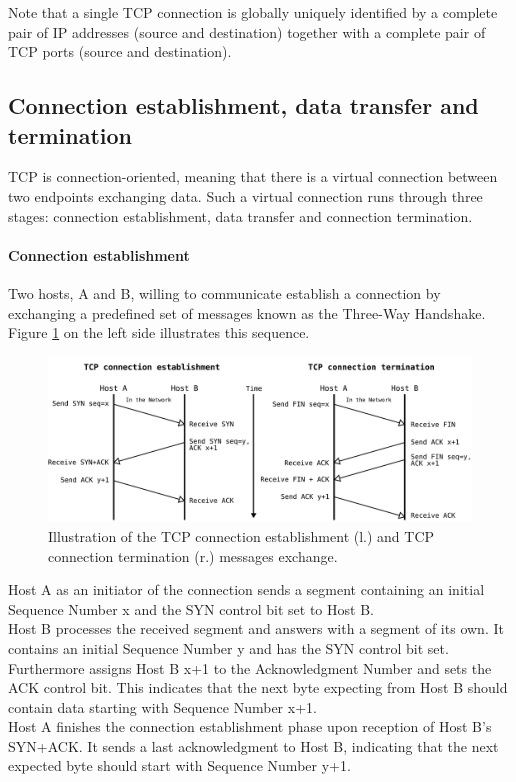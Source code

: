 Note that a single TCP connection is globally uniquely identified by a complete pair of IP addresses (source and destination) together with a complete pair of TCP ports (source and destination).

\subsection*{Connection establishment, data transfer and termination}

TCP is connection-oriented, meaning that there is a virtual connection between two endpoints exchanging data. Such a virtual connection runs through three stages: connection establishment, data transfer and connection termination.

\paragraph{Connection establishment}

Two hosts, A and B, willing to communicate establish a connection by exchanging a predefined set of messages known as the Three-Way Handshake. Figure \ref{fig:TCPConnectionEstablishmentAndTermination} on the left side illustrates this sequence. 

\begin{figure}[H]
	\begin{center} 
		\def\svgwidth{1\textwidth}
		\includegraphics[scale=0.24]{../illustrations/importantConcepts/TCPHandshake.pdf} 
		\caption[Caption for the list of figures.]{Illustration of the TCP connection establishment (l.) and TCP connection termination (r.) messages exchange.}
		\label{fig:TCPConnectionEstablishmentAndTermination}
	\end{center}
\end{figure}

Host A as an initiator of the connection sends a segment containing an initial Sequence Number x and the SYN control bit set to Host B. \smallskip\\Host B processes the received segment and answers with a segment of its own. It contains an initial Sequence Number y and has the SYN control bit set. Furthermore assigns Host B x+1 to the Acknowledgment Number and sets the ACK control bit. This indicates that the next byte expecting from Host B should contain data starting with Sequence Number x+1. \smallskip\\ Host A finishes the connection establishment phase upon reception of Host B's SYN+ACK. It sends a last acknowledgment to Host B, indicating that the next expected byte should start with Sequence Number y+1.

